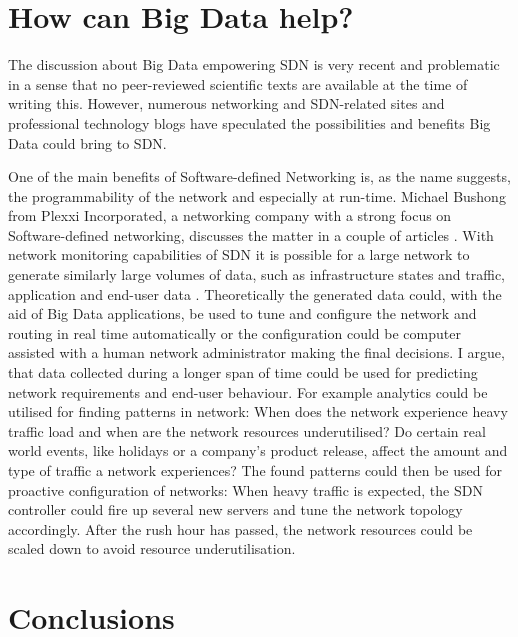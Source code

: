 \documentclass{acm_proc_article-sp}
\begin{document}
\section{How can Big Data help?}

The discussion about Big Data empowering SDN is very recent and problematic in a sense that no peer-reviewed scientific texts are available at the time of writing this. However, numerous networking and SDN-related sites and professional technology blogs have speculated the possibilities and benefits Big Data could bring to SDN.

One of the main benefits of Software-defined Networking is, as the name suggests, the programmability of the network and especially at run-time. Michael Bushong from Plexxi Incorporated, a networking company with a strong focus on Software-defined networking, discusses the matter in a couple of articles \cite{Bushong2013, Bushong2013-2}. With network monitoring capabilities of SDN it is possible for a large network to generate similarly large volumes of data, such as infrastructure states and traffic, application and end-user data \cite{Bushong2013}. Theoretically the generated data could, with the aid of Big Data applications, be used to tune and configure the network and routing in real time automatically or the configuration could be computer assisted with a human network administrator making the final decisions. I argue, that data collected during a longer span of time could be used for predicting network requirements and end-user behaviour. For example analytics could be utilised for finding patterns in network: When does the network experience heavy traffic load and when are the network resources underutilised? Do certain real world events, like holidays or a company's product release, affect the amount and type of traffic a network experiences? The found patterns could then be used for proactive configuration of networks: When heavy traffic is expected, the SDN controller could fire up several new servers and tune the network topology accordingly. After the rush hour has passed, the network resources could be scaled down to avoid resource underutilisation.



\section{Conclusions}



\end{document}
